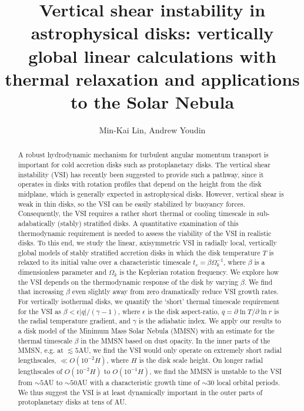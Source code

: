 \documentclass[iop]{emulateapj}
\newcommand{\p}{\partial}
\begin{document}
\title{Vertical shear instability in astrophysical disks: vertically global linear calculations with thermal relaxation and applications to the Solar Nebula} 
\author{Min-Kai Lin, Andrew Youdin}

\begin{abstract}
  A robust hydrodynamic mechanism for turbulent angular momentum
  transport is important for cold accretion disks such as 
  protoplanetary disks. The vertical shear instability (VSI) has 
  recently been suggested to provide such a pathway, since it operates in
  disks with rotation profiles that depend on the height from the 
  disk midplane, which is generally expected in  
  astrophysical disks. However, vertical shear is weak in thin disks, 
  so the VSI can be easily stabilized by buoyancy forces. Consequently,  
  the VSI requires a rather short thermal or cooling timescale in
  sub-adabatically (stably) stratified disks.     
  A quantitative examination of this thermodynamic 
  requirement is needed to assess the viability of
  the VSI in realistic disks. To this end,  
  we study the linear, axisymmetric VSI in radially local, 
  vertically global models of stably stratified accretion disks in which the disk  
  temperature $T$ is relaxed to its initial value over a characteristic timescale 
  $t_c=\beta\Omega_k^{-1}$, where $\beta$ is a dimensionless parameter 
  and $\Omega_k$ is the Keplerian rotation frequency. We explore how
  the VSI depends on the thermodynamic response of the disk by
  varying $\beta$. We find that 
  increasing $\beta$ even slightly away from    
  zero dramatically reduce VSI growth rates. 
  For vertically isothermal disks, we quantify the
  `short' thermal timescale requirement for the VSI as $\beta < \epsilon|q|/(\gamma-1)$, where
  $\epsilon$ is the disk aspect-ratio, $q = \p\ln T/\p\ln r$  is the radial temperature gradient, and 
  $\gamma$ is the adiabatic index. 
  We apply our results  
  to a disk model of the Minimum Mass Solar Nebula (MMSN) with an  
  estimate for the thermal timescale $\beta$ in the MMSN based on dust
  opacity. In the inner parts of the MMSN, e.g. at $\lesssim 5$AU, 
  we find the VSI would only operate on extremely short radial lengthscales, $\ll 
  O(10^{-2}H)$, where $H$ is the disk scale height. On longer radial 
  lengthscales of $O(10^{-2}H)$ to $O(10^{-1}H)$, we find the MMSN is
  unstable to the VSI from $\sim 5$AU to $\sim 50$AU with a
  characteristic growth time of $\sim 30$ local orbital periods.  
  We thus suggest the VSI is at least dynamically important in the 
  outer parts of protoplanetary disks at tens of AU. 
\end{abstract}
\end{document}
